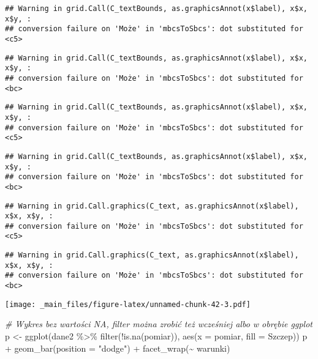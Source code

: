 \documentclass[
]{book}
\newenvironment{Shaded}{\begin{snugshade}}{\end{snugshade}}
\newcommand{\AttributeTok}[1]{\textcolor[rgb]{0.77,0.63,0.00}{#1}}
\newcommand{\CommentTok}[1]{\textcolor[rgb]{0.56,0.35,0.01}{\textit{#1}}}
\newcommand{\FunctionTok}[1]{\textcolor[rgb]{0.00,0.00,0.00}{#1}}
\newcommand{\NormalTok}[1]{#1}
\newcommand{\OtherTok}[1]{\textcolor[rgb]{0.56,0.35,0.01}{#1}}
\newcommand{\SpecialCharTok}[1]{\textcolor[rgb]{0.00,0.00,0.00}{#1}}
\newcommand{\StringTok}[1]{\textcolor[rgb]{0.31,0.60,0.02}{#1}}
\begin{document}
\begin{verbatim}
## Warning in grid.Call(C_textBounds, as.graphicsAnnot(x$label), x$x, x$y, :
## conversion failure on 'Może' in 'mbcsToSbcs': dot substituted for <c5>
\end{verbatim}

\begin{verbatim}
## Warning in grid.Call(C_textBounds, as.graphicsAnnot(x$label), x$x, x$y, :
## conversion failure on 'Może' in 'mbcsToSbcs': dot substituted for <bc>
\end{verbatim}

\begin{verbatim}
## Warning in grid.Call(C_textBounds, as.graphicsAnnot(x$label), x$x, x$y, :
## conversion failure on 'Może' in 'mbcsToSbcs': dot substituted for <c5>
\end{verbatim}

\begin{verbatim}
## Warning in grid.Call(C_textBounds, as.graphicsAnnot(x$label), x$x, x$y, :
## conversion failure on 'Może' in 'mbcsToSbcs': dot substituted for <bc>
\end{verbatim}

\begin{verbatim}
## Warning in grid.Call.graphics(C_text, as.graphicsAnnot(x$label), x$x, x$y, :
## conversion failure on 'Może' in 'mbcsToSbcs': dot substituted for <c5>
\end{verbatim}

\begin{verbatim}
## Warning in grid.Call.graphics(C_text, as.graphicsAnnot(x$label), x$x, x$y, :
## conversion failure on 'Może' in 'mbcsToSbcs': dot substituted for <bc>
\end{verbatim}

\texttt{[image: \_main\_files/figure-latex/unnamed-chunk-42-3.pdf]}

\begin{Shaded}
\begin{Highlighting}[]
\CommentTok{\# Wykres bez wartości NA, filter można zrobić też wcześniej albo w obrębie ggplot}
\NormalTok{p }\OtherTok{\textless{}{-}} \FunctionTok{ggplot}\NormalTok{(dane2 }\SpecialCharTok{\%\textgreater{}\%} \FunctionTok{filter}\NormalTok{(}\SpecialCharTok{!}\FunctionTok{is.na}\NormalTok{(pomiar)), }\FunctionTok{aes}\NormalTok{(}\AttributeTok{x =}\NormalTok{ pomiar, }\AttributeTok{fill =}\NormalTok{ Szczep))}
\NormalTok{p }\SpecialCharTok{+} \FunctionTok{geom\_bar}\NormalTok{(}\AttributeTok{position =} \StringTok{"dodge"}\NormalTok{) }\SpecialCharTok{+} \FunctionTok{facet\_wrap}\NormalTok{(}\SpecialCharTok{\textasciitilde{}}\NormalTok{ warunki)}
\end{Highlighting}
\end{Shaded}
\end{document}
